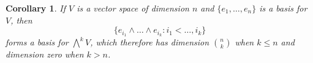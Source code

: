 \documentclass[reqno]{amsart}
\newtheorem{corollary}[theorem]{Corollary}
\theoremstyle{definition}
\theoremstyle{remark}
\begin{document}
\begin{corollary}
	If $V$ is a vector space of dimension $n$ and $\{e_1, \dots, e_n\}$ is a basis for $V$, then 
	\[ \{ e_{i_1} \wedge \dots \wedge e_{i_k} : i_1 < \dots, i_k \} \]
forms a basis for $\bigwedge^k V$, which therefore has dimension $\binom{n}{k}$ when $k \leq n$ and dimension zero when $k > n$.
\end{corollary}
\end{document}
